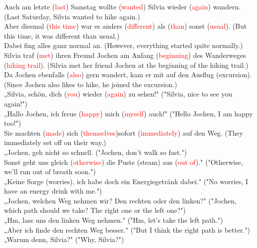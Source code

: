 \documentclass{article}
\begin{document}
Auch am letzte (\textcolor{red}{last}) Samstag wollte (\textcolor{red}{wanted}) Silvia wieder (\textcolor{red}{again}) wandern. (Last Saturday, Silvia wanted to hike again.) \\
Aber diesmal (\textcolor{red}{this time}) war es anders (\textcolor{red}{different}) als (\textcolor{red}{than}) sonst (\textcolor{red}{usual}). (But this time, it was different than usual.) \\
Dabei fing alles ganz normal an. (However, everything started quite normally.) \\
Silvia traf (\textcolor{red}{met}) ihren Freund Jochen am Anfang (\textcolor{red}{beginning}) des Wanderweges (\textcolor{red}{hiking trail}). (Silvia met her friend Jochen at the beginning of the hiking trail.) \\
Da Jochen ebenfalls (\textcolor{red}{also}) gern wandert, kam er mit auf den Ausflug (excursion). (Since Jochen also likes to hike, he joined the excursion.) \\

„Silvia, schön, dich (\textcolor{red}{you}) wieder (\textcolor{red}{again}) zu sehen!" ("Silvia, nice to see you again!") \\
„Hallo Jochen, ich freue (\textcolor{red}{happy}) mich (\textcolor{red}{myself}) auch!" ("Hello Jochen, I am happy too!") \\
Sie machten (\textcolor{red}{made}) sich (\textcolor{red}{themselves})sofort (\textcolor{red}{immediately}) auf den Weg. (They immediately set off on their way.) \\

„Jochen, geh nicht so schnell. ("Jochen, don't walk so fast.") \\
Sonst geht uns gleich (\textcolor{red}{otherwise}) die Puste (steam) aus (\textcolor{red}{out of})." ("Otherwise, we'll run out of breath soon.") \\

„Keine Sorge (worries), ich habe doch ein Energiegetränk dabei." ("No worries, I have an energy drink with me.") \\

„Jochen, welchen Weg nehmen wir? Den rechten oder den linken?" ("Jochen, which path should we take? The right one or the left one?") \\
„Hm, lass uns den linken Weg nehmen." ("Hm, let's take the left path.") \\
„Aber ich finde den rechten Weg besser." ("But I think the right path is better.") \\
„Warum denn, Silvia?" ("Why, Silvia?") \\
\end{document}
